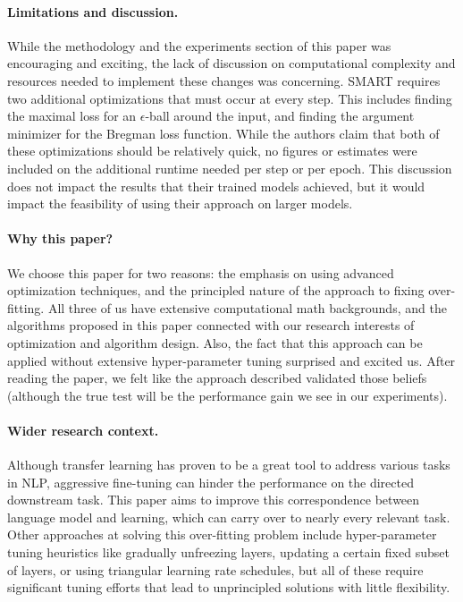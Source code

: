 \documentclass{article}
\begin{document}
\paragraph{Limitations and discussion.}
While the methodology and the experiments section of this paper was encouraging and exciting, the lack of discussion on computational complexity and resources needed to implement these changes was concerning. SMART requires two additional optimizations that must occur at every step. This includes finding the maximal loss for an $\epsilon$-ball around the input, and finding the argument minimizer for the Bregman loss function. While the authors claim that both of these optimizations should be relatively quick, no figures or estimates were included on the additional runtime needed per step or per epoch. This discussion does not impact the results that their trained models achieved, but it would impact the feasibility of using their approach on larger models. 

\paragraph{Why this paper?}

We choose this paper for two reasons: the emphasis on using advanced optimization techniques, and the principled nature of the approach to fixing over-fitting. All three of us have extensive computational math backgrounds, and the algorithms proposed in this paper connected with our research interests of optimization and algorithm design. Also, the fact that this approach can be applied without extensive hyper-parameter tuning surprised and excited us. After reading the paper, we felt like the approach described validated those beliefs (although the true test will be the performance gain we see in our experiments).

\paragraph{Wider research context.}
Although transfer learning has proven to be a great tool to address various tasks in NLP, aggressive fine-tuning can hinder the performance on the directed downstream task. This paper aims to improve this correspondence between language model and learning, which can carry over to nearly every relevant task. Other approaches at solving this over-fitting problem include hyper-parameter tuning heuristics like gradually unfreezing layers, updating a certain fixed subset of layers, or using triangular learning rate schedules, but all of these require significant tuning efforts that lead to unprincipled solutions with little flexibility. 
\end{document}
